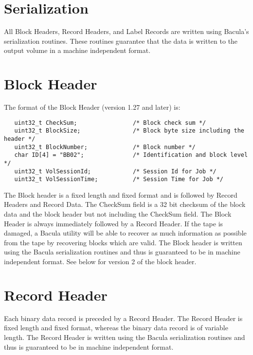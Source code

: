 \section{Serialization}

All Block Headers, Record Headers, and Label Records are written using
Bacula's serialization routines. These routines guarantee that the data is
written to the output volume in a machine independent format.

\section{Block Header}

The format of the Block Header (version 1.27 and later) is:

\footnotesize
\begin{verbatim}
   uint32_t CheckSum;                /* Block check sum */
   uint32_t BlockSize;               /* Block byte size including the header */
   uint32_t BlockNumber;             /* Block number */
   char ID[4] = "BB02";              /* Identification and block level */
   uint32_t VolSessionId;            /* Session Id for Job */
   uint32_t VolSessionTime;          /* Session Time for Job */
\end{verbatim}
\normalsize

The Block header is a fixed length and fixed format and is followed by Record
Headers and Record Data. The CheckSum field is a 32 bit checksum of the block
data and the block header but not including the CheckSum field. The Block
Header is always immediately followed by a Record Header. If the tape is
damaged, a Bacula utility will be able to recover as much information as
possible from the tape by recovering blocks which are valid. The Block header
is written using the Bacula serialization routines and thus is guaranteed to
be in machine independent format. See below for version 2 of the block header.


\section{Record Header}

Each binary data record is preceded by a Record Header. The Record Header is
fixed length and fixed format, whereas the binary data record is of variable
length. The Record Header is written using the Bacula serialization routines
and thus is guaranteed to be in machine independent format.


